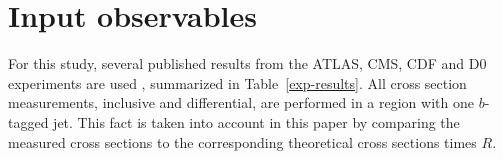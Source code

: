 \documentclass[11pt]{article}
\newcommand{\VTD}{|V_{td}|}
\newcommand{\VTS}{|V_{ts}|}
\newcommand{\VTB}{|V_{tb}|}
\begin{document}
\section{Input observables}

For this study, several published results from the ATLAS, CMS, CDF and D0 experiments are used \cite{Aad:2014fwa,Aaboud:2017pdi,Aaboud:2016ymp,Chatrchyan:2012ep,Khachatryan:2014iya,Sirunyan:2016cdg,Aaltonen:2014mza,Abazov:2011rz,Aad:2012xca,Aad:2015eto,Aaboud:2016lpj,Chatrchyan:2012zca,Chatrchyan:2014tua,Khachatryan:2014nda,Aaboud:2017uqq,Aaltonen:2013kna,Aaltonen:2010ea}, summarized in Table~\ref{exp-results}.
All cross section measurements, inclusive and differential, are performed in a region with one $b$-tagged jet. This fact is taken into account in this paper by comparing the measured cross sections to the corresponding theoretical cross sections times $R$.
\end{document}
